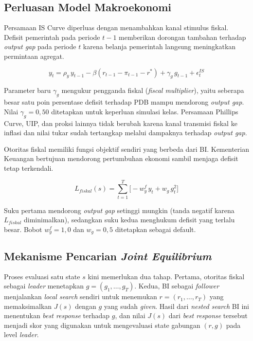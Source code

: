 \subsection{Perluasan Model Makroekonomi}

Persamaan IS Curve diperluas dengan menambahkan kanal stimulus fiskal. Defisit pemerintah pada periode $t-1$ memberikan dorongan tambahan terhadap \textit{output gap} pada periode $t$ karena belanja pemerintah langsung meningkatkan permintaan agregat.

\[
    y_t = \rho_y \, y_{t-1} - \beta (r_{t-1} - \pi_{t-1} - r^{*}) + \gamma_g \, g_{t-1} + \epsilon_t^{IS}
\]

Parameter baru $\gamma_g$ mengukur pengganda fiskal (\textit{fiscal multiplier}), yaitu seberapa besar satu poin persentase defisit terhadap PDB mampu mendorong \textit{output gap}. Nilai $\gamma_g = 0{,}50$ ditetapkan untuk keperluan simulasi kelas. Persamaan Phillips Curve, UIP, dan proksi lainnya tidak berubah karena kanal transmisi fiskal ke inflasi dan nilai tukar sudah tertangkap melalui dampaknya terhadap \textit{output gap}.

Otoritas fiskal memiliki fungsi objektif sendiri yang berbeda dari BI. Kementerian Keuangan bertujuan mendorong pertumbuhan ekonomi sambil menjaga defisit tetap terkendali.

\[
    L_{fiskal}(s) = \sum_{t=1}^{T} \Big[ -w_y^{f} \, y_t + w_g \, g_t^{2} \Big]
\]

Suku pertama mendorong \textit{output gap} setinggi mungkin (tanda negatif karena $L_{fiskal}$ diminimalkan), sedangkan suku kedua menghukum defisit yang terlalu besar. Bobot $w_y^{f} = 1{,}0$ dan $w_g = 0{,}5$ ditetapkan sebagai default.

\subsection{Mekanisme Pencarian \textit{Joint Equilibrium}}

Proses evaluasi satu state $s$ kini memerlukan dua tahap. Pertama, otoritas fiskal sebagai \textit{leader} menetapkan $g = (g_1, \dots, g_T)$. Kedua, BI sebagai \textit{follower} menjalankan \textit{local search} sendiri untuk menemukan $r = (r_1, \dots, r_T)$ yang memaksimalkan $J(s)$ dengan $g$ yang sudah \textit{given}. Hasil dari \textit{nested search} BI ini menentukan \textit{best response} terhadap $g$, dan nilai $J(s)$ dari \textit{best response} tersebut menjadi skor yang digunakan untuk mengevaluasi state gabungan $(r, g)$ pada level \textit{leader}.


